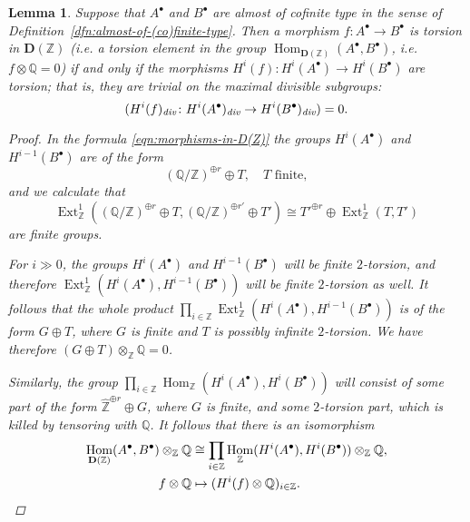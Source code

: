 \documentclass[draft,leqno,12pt]{article}
\theoremstyle{plain}
\newtheorem{lemma}[theorem]{\indent\sc Lemma}
\theoremstyle{definition}
\DeclareMathOperator{\Hom}{Hom}
\DeclareMathOperator{\Ext}{Ext}
\newcommand{\ZZ}{\mathbb{Z}}
\newcommand{\QQ}{\mathbb{Q}}
\renewcommand{\div}{\text{\it div}}
\begin{document}
\begin{lemma}
  \label{lemma:torsion-morphisms-in-D(Z)}
  Suppose that $A^\bullet$ and $B^\bullet$ are almost of cofinite type in the
  sense of Definition~\ref{dfn:almost-of-(co)finite-type}. Then a morphism
  $f\colon A^\bullet\to B^\bullet$ is torsion in $\mathbf{D} (\ZZ)$
  (i.e. a torsion element in the group
  $\Hom_{\mathbf{D} (\ZZ)} (A^\bullet, B^\bullet)$, i.e.
  $f\otimes \mathbb{Q} = 0$) if and only if the morphisms
  $H^i (f)\colon H^i (A^\bullet) \to H^i (B^\bullet)$
  are torsion; that is, they are trivial on the maximal divisible subgroups:
  $$(H^i (f)_\div\colon H^i (A^\bullet)_\div \to H^i (B^\bullet)_\div) = 0.$$

  \begin{proof}
    In the formula \eqref{eqn:morphisms-in-D(Z)} the groups $H^i (A^\bullet)$
    and $H^{i-1} (B^\bullet)$ are of the form
    \[ (\mathbb{Q}/\mathbb{Z})^{\oplus r} \oplus T,
      \quad T\text{ finite}, \]
    and we calculate that
    \[ \Ext_\ZZ^1 ((\QQ/\ZZ)^{\oplus r} \oplus T, (\QQ/\ZZ)^{\oplus r'} \oplus T') \cong
    T'^{\oplus r} \oplus \Ext_\ZZ^1 (T, T') \]
    are finite groups.

    For $i \gg 0$, the groups $H^i (A^\bullet)$ and $H^{i-1} (B^\bullet)$ will
    be finite $2$-torsion, and therefore
    $\Ext_\ZZ^1 (H^i (A^\bullet), H^{i-1} (B^\bullet))$ will be finite
    $2$-torsion as well. It follows that the whole product
    $\prod_{i\in \mathbb{Z}} \Ext_\ZZ^1 (H^i (A^\bullet), H^{i-1} (B^\bullet))$
    is of the form $G \oplus T$, where $G$ is finite and $T$ is possibly
    infinite $2$-torsion. We have therefore $(G \oplus T)\otimes_\ZZ \QQ = 0$.

    Similarly, the group
    $\prod_{i\in\ZZ} \Hom_\ZZ (H^i (A^\bullet), H^i (B^\bullet))$ will consist
    of some part of the form $\widehat{\ZZ}^{\oplus r} \oplus G$, where $G$
    is finite, and some $2$-torsion part, which is killed by tensoring with
    $\QQ$. It follows that there is an isomorphism
    \begin{align*}
      \Hom_{\mathbf{D} (\ZZ)} (A^\bullet, B^\bullet)\otimes_\ZZ \mathbb{Q} & \cong
      \prod_{i\in \mathbb{Z}} \Hom_\ZZ (H^i (A^\bullet), H^i (B^\bullet)) \otimes_\ZZ \mathbb{Q}, \\
      f\otimes\QQ & \mapsto (H^i (f) \otimes \QQ)_{i\in\ZZ}. \qedhere
    \end{align*}
  \end{proof}
\end{lemma}
\end{document}
